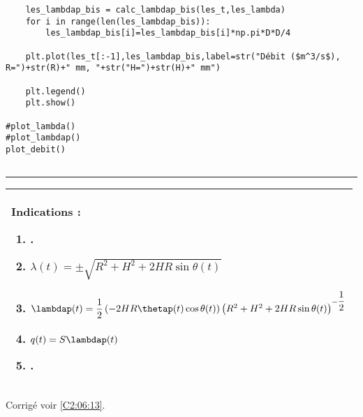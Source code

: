 \begin{lstlisting}
    les_lambdap_bis = calc_lambdap_bis(les_t,les_lambda)
    for i in range(len(les_lambdap_bis)):
        les_lambdap_bis[i]=les_lambdap_bis[i]*np.pi*D*D/4

    plt.plot(les_t[:-1],les_lambdap_bis,label=str("Débit ($m^3/s$), R=")+str(R)+" mm, "+str("H=")+str(H)+" mm")

    plt.legend()
    plt.show()
    
#plot_lambda()
#plot_lambdap()
plot_debit()


\end{lstlisting}
\noindent\hrule

\else
\fi




\ifprof
\else
\footnotesize
\begin{center}
\begin{tabular}{|p{.9\linewidth}|}
\hline
Indications :
\begin{enumerate}
\item .
\item $\lambda(t) = \pm\sqrt{ R^2  +H^2 +2 HR\sin\theta(t)}$
\item $\lambdap(t) = \dfrac{1}{2}\left(-  2 HR\thetap(t)\cos\theta(t)\right)\left(R^2  +H^2 +2 HR\sin\theta(t)\right)^{-\dfrac{1}{2}}$
\item $q(t)=S\lambdap(t)$
\item .
\end{enumerate} \\ \hline
\end{tabular}
\end{center}
\normalsize
\begin{flushright}
\footnotesize{Corrigé  voir \ref{C2:06:13}.}
\end{flushright}%
\fi